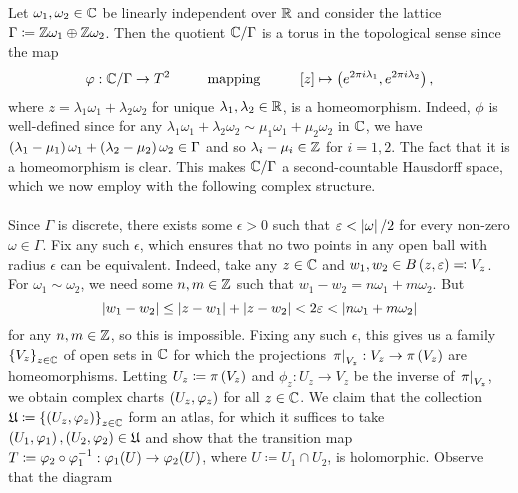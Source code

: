 \documentclass[../Moduli_Spaces_of_Riemann_Surfaces.tex]{subfiles}
\begin{document}
    \begin{example}
        Let $\omega_1,\omega_2\in\mathbb{C}$ be linearly independent over $\mathbb{R}$ and consider the lattice $\Gamma\coloneqq\mathbb{Z}\omega_1\oplus\mathbb{Z}\omega_2$. Then the quotient $\mathbb{C}/\Gamma$ is a torus in the topological sense since the map
        \begin{equation*}
            \phi:\C/\Gamma\to T^2\ \ \ \ \ \ \ \ \textrm{mapping}\ \ \ \ \ \ \ \ \l[z\r]\mapsto\tpl{e^{2\pi i\lambda_1},e^{2\pi i\lambda_2}},
        \end{equation*}
        where $z=\lambda_1\omega_1+\lambda_2\omega_2$ for unique $\lambda_1,\lambda_2\in\mathbb{R}$, is a homeomorphism. Indeed, $\phi$ is well-defined since for any $\lambda_1\omega_1+\lambda_2\omega_2\sim\mu_1\omega_1+\mu_2\omega_2$ in $\mathbb{C}$, we have $\left(\lambda_1-\mu_1\right)\omega_1+\left(\lambda_2-\mu_2\right)\omega_2\in\Gamma$ and so $\lambda_i-\mu_i\in\mathbb{Z}$ for $i=1,2$. The fact that it is a homeomorphism is clear. This makes $\mathbb{C}/\Gamma$ a second-countable Hausdorff space, which we now employ with the following complex structure.\\\ \\
        Since $\Gamma$ is discrete, there exists some $\epsilon>0$ such that $\varepsilon<\left|\omega\right|/2$ for every non-zero $\omega\in\Gamma$. Fix any such $\epsilon$, which ensures that no two points in any open ball with radius $\epsilon$ can be equivalent. Indeed, take any $z\in\mathbb{C}$ and $w_1,w_2\in B\left(z,\varepsilon\right)\eqqcolon V_z$. For $\omega_1\sim\omega_2$, we need some $n,m\in\mathbb{Z}$ such that $w_1-w_2=n\omega_1+m\omega_2$. But
        \begin{equation*}
            \left|w_1-w_2\right|\leq\left|z-w_1\right|+\left|z-w_2\right|<2\varepsilon<\left|n\omega_1+m\omega_2\right|
        \end{equation*}
        for any $n,m\in\mathbb{Z}$, so this is impossible. Fixing any such $\epsilon$, this gives us a family $\left\{V_z\right\}_{z\in\mathbb{C}}$ of open sets in $\mathbb{C}$ for which the projections $\left.\pi\right|_{V_z}:V_z\to\pi\left(V_z\right)$ are homeomorphisms. Letting $U_z\coloneqq\pi\left(V_z\right)$ and $\phi_z:U_z\to V_z$ be the inverse of $\left.\pi\right|_{V_z}$, we obtain complex charts $\left(U_z,\varphi_z\right)$ for all $z\in\mathbb{C}$. We claim that the collection $\mathfrak{U}\coloneqq\left\{\left(U_z,\varphi_z\right)\right\}_{z\in\mathbb{C}}$ form an atlas, for which it suffices to take $\left(U_1,\varphi_1\right),\left(U_2,\varphi_2\right)\in\mathfrak{U}$ and show that the transition map $T\coloneqq\varphi_2\circ\varphi_1^{-1}:\varphi_1\!\left(U\right)\to\varphi_2\!\left(U\right)$, where $U\coloneqq U_1\cap U_2$, is holomorphic. Observe that the diagram

\end{example}
\end{document}
